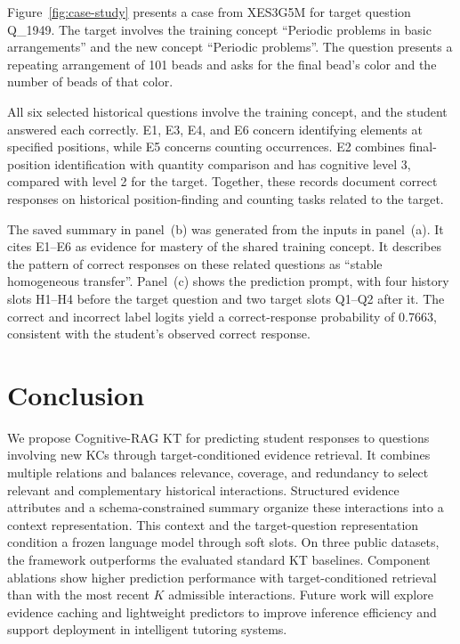 \documentclass{llncs}
\begin{document}
Figure~\ref{fig:case-study} presents a case from XES3G5M for target question Q\_1949. The target involves the training concept ``Periodic problems in basic arrangements'' and the new concept ``Periodic problems''. The question presents a repeating arrangement of 101 beads and asks for the final bead's color and the number of beads of that color.

All six selected historical questions involve the training concept, and the student answered each correctly. E1, E3, E4, and E6 concern identifying elements at specified positions, while E5 concerns counting occurrences. E2 combines final-position identification with quantity comparison and has cognitive level 3, compared with level 2 for the target. Together, these records document correct responses on historical position-finding and counting tasks related to the target.

The saved summary in panel~(b) was generated from the inputs in panel~(a). It cites E1--E6 as evidence for mastery of the shared training concept. It describes the pattern of correct responses on these related questions as ``stable homogeneous transfer''. Panel~(c) shows the prediction prompt, with four history slots H1--H4 before the target question and two target slots Q1--Q2 after it. The correct and incorrect label logits yield a correct-response probability of 0.7663, consistent with the student's observed correct response.

\FloatBarrier

\section{Conclusion}

We propose Cognitive-RAG KT for predicting student responses to questions involving new KCs through target-conditioned evidence retrieval. It combines multiple relations and balances relevance, coverage, and redundancy to select relevant and complementary historical interactions. Structured evidence attributes and a schema-constrained summary organize these interactions into a context representation. This context and the target-question representation condition a frozen language model through soft slots. On three public datasets, the framework outperforms the evaluated standard KT baselines. Component ablations show higher prediction performance with target-conditioned retrieval than with the most recent $K$ admissible interactions. Future work will explore evidence caching and lightweight predictors to improve inference efficiency and support deployment in intelligent tutoring systems.




\end{document}
